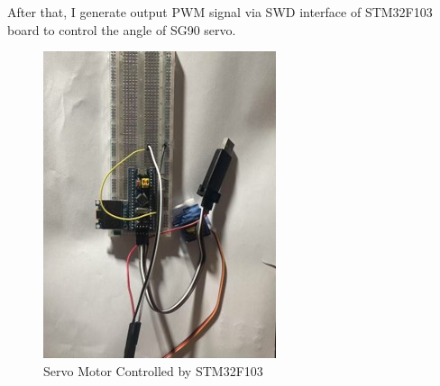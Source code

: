 \documentclass{senior-design-individual}
\begin{document}
After that, I generate output PWM signal via SWD interface of STM32F103 board to control the angle of SG90 servo. 
\begin{figure}[h]
    \centering
    \includegraphics[width=0.6\linewidth]{STM32F103.png}
    \caption{Servo Motor Controlled by STM32F103}
\end{figure}
 
\end{document}
